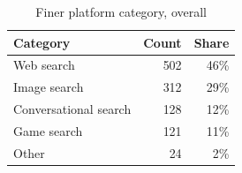 \begin{table}[t]
\centering
\caption{Finer platform category, overall}
\label{tab:rq10-finer-platform-category}
\begin{tabular}{lrr}
\toprule
Category & Count & Share \\
\midrule
Web search & 502 & 46\% \\
Image search & 312 & 29\% \\
Conversational search & 128 & 12\% \\
Game search & 121 & 11\% \\
Other & 24 & 2\% \\
\bottomrule
\end{tabular}
\end{table}

